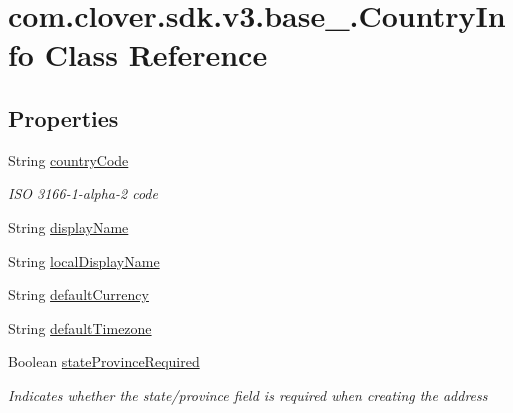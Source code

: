 \hypertarget{classcom_1_1clover_1_1sdk_1_1v3_1_1base___1_1_country_info}{}\section{com.\+clover.\+sdk.\+v3.\+base\+\_\+.\+Country\+Info Class Reference}
\label{classcom_1_1clover_1_1sdk_1_1v3_1_1base___1_1_country_info}
\subsection*{Properties}
\begin{DoxyCompactItemize}
\item 
String \hyperlink{classcom_1_1clover_1_1sdk_1_1v3_1_1base___1_1_country_info_aaa35e971abab07f0f55c126a0c4a8796}{country\+Code}
\begin{DoxyCompactList}\small\item\em I\+SO 3166-\/1-\/alpha-\/2 code \end{DoxyCompactList}\item 
String \hyperlink{classcom_1_1clover_1_1sdk_1_1v3_1_1base___1_1_country_info_ad49a5e30ea3395bd3f108d83deb96b20}{display\+Name}
\item 
String \hyperlink{classcom_1_1clover_1_1sdk_1_1v3_1_1base___1_1_country_info_a9704e4b085dbb521eeb7094fc73e8ec5}{local\+Display\+Name}
\item 
String \hyperlink{classcom_1_1clover_1_1sdk_1_1v3_1_1base___1_1_country_info_a6c014d87ba754ae72e4ad5b23bbddf1b}{default\+Currency}
\item 
String \hyperlink{classcom_1_1clover_1_1sdk_1_1v3_1_1base___1_1_country_info_a4a373f1bc6b5e82df037d353010b9cda}{default\+Timezone}
\item 
Boolean \hyperlink{classcom_1_1clover_1_1sdk_1_1v3_1_1base___1_1_country_info_a2faf9d387822900e0e9c6f21554712bd}{state\+Province\+Required}
\begin{DoxyCompactList}\small\item\em Indicates whether the state/province field is required when creating the address \end{DoxyCompactList}\item 

\end{DoxyCompactItemize}
